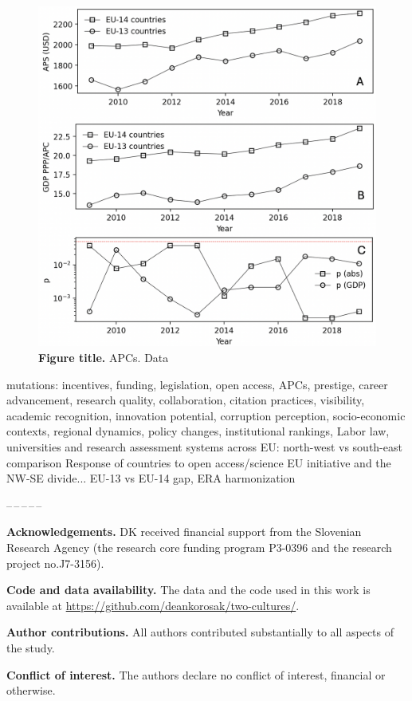 \documentclass[amsfonts, amssymb, prl, superscriptaddress, notitlepage, twocolumn, nofootinbib]{revtex4-2}
\begin{document}
\begin{figure}
    \centering
    \includegraphics[width=.95\linewidth]{Fig06.png}
    \caption{\label{fig:fig6} {\bf Figure title.} APCs. Data~\cite{kbel_ross-hellauer_2022,worldbank_gdp_per_capita_ppp}  
}
\end{figure}

mutations: incentives, funding, legislation, open access, APCs, prestige, career advancement, research quality, collaboration, citation practices, visibility, academic recognition, innovation potential, corruption perception, socio-economic contexts, regional dynamics, policy changes, institutional rankings,
Labor law, universities and research assessment systems across EU: north-west vs south-east comparison 
Response of countries to open access/science EU initiative and the NW-SE divide... EU-13 vs EU-14 gap, ERA harmonization
  
\begin{center}
--\,--\,--\,--\,--
\end{center}
\vspace{1mm}
\noindent\textbf{Acknowledgements.} DK received financial support from the Slovenian Research Agency (the research core funding program P3-0396 and the research project no.J7-3156). 

\noindent\textbf{Code and data availability.} The data and the code used in this work is available at \url{https://github.com/deankorosak/two-cultures/}.

\noindent\textbf{Author contributions.} All authors contributed substantially to all aspects of the study.

\noindent\textbf{Conflict of interest.} The authors declare no conflict of interest, financial or otherwise.
 

{}

\end{document}
